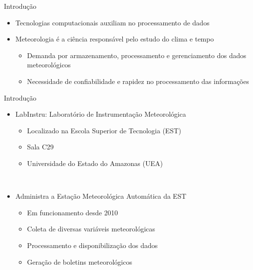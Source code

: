 \begin{frame}{Introdução}
\begin{itemize}
\item Tecnologias computacionais auxiliam no processamento de dados
\ \ \newline
\item \alert{Meteorologia} é a ciência responsável pelo estudo do clima e tempo
\begin{itemize}
	\item Demanda por armazenamento, processamento e gerenciamento dos dados meteorológicos
	\item Necessidade  de confiabilidade e rapidez no processamento das informações
\end{itemize}
\end{itemize}
\end{frame}

\begin{frame}{Introdução}
\begin{itemize}
\item LabInstru: Laboratório de Instrumentação Meteorológica
\begin{itemize}
	\item Localizado na Escola Superior de Tecnologia (EST)
	\item Sala C29
	\item Universidade do Estado do Amazonas (UEA)
\end{itemize}
\ \ \newline
\item Administra a \alert{Estação Meteorológica Automática} da EST
\begin{itemize}
	\item Em funcionamento desde 2010
	\item Coleta de diversas variáveis meteorológicas
	\item Processamento e disponibilização dos dados
	\item Geração de boletins meteorológicos
\end{itemize}
\end{itemize}
\end{frame}

